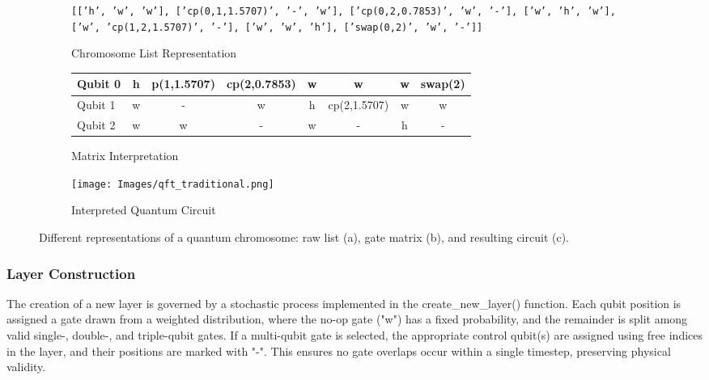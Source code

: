 \documentclass[11pt,a4paper]{article}
\begin{document}
\begin{figure}[H]
    \centering

    \begin{subfigure}[b]{0.9\textwidth}
        \centering
        \texttt{[['h', 'w', 'w'], ['cp(0,1,1.5707)', '-', 'w'], ['cp(0,2,0.7853)', 'w', '-'], ['w', 'h', 'w'], 
        ['w', 'cp(1,2,1.5707)', '-'], ['w', 'w', 'h'], ['swap(0,2)', 'w', '-']]}
        \caption{Chromosome List Representation}
        \label{fig:chromosome_list}
    \end{subfigure}

    \vspace{1em}

    \begin{subfigure}[b]{0.65\textwidth}
        \centering
        \small
        \begin{tabular}{l | c c c c c c c}
            \toprule
            Qubit 0 & h & p(1,1.5707) & cp(2,0.7853) & w & w & w & swap(2) \\
            \midrule
            Qubit 1 & w & - & w & h & cp(2,1.5707) & w & w \\
            \midrule
            Qubit 2 & w & w & - & w & - & h & - \\
            \bottomrule
        \end{tabular}
        \caption{Matrix Interpretation}
        \label{fig:chromosome_matrix}
    \end{subfigure}

    \vspace{1em}

    \begin{subfigure}[b]{0.6\textwidth}
        \centering
        \texttt{[image: Images/qft\_traditional.png]}
        \caption{Interpreted Quantum Circuit}
        \label{fig:chromosome_circuit}
    \end{subfigure}

    \caption{Different representations of a quantum chromosome: raw list (a), gate matrix (b), and resulting circuit (c).}
    \label{fig:chromosome_representations}
\end{figure}\newpage

\subsubsection*{Layer Construction}
The creation of a new layer is governed by a stochastic process implemented in the create\_new\_layer() function. Each qubit position is assigned a gate drawn from a weighted distribution, where the no-op gate ("w") has a fixed probability, and the remainder is split among valid single-, double-, and triple-qubit gates. If a multi-qubit gate is selected, the appropriate control qubit(s) are assigned using free indices in the layer, and their positions are marked with "-". This ensures no gate overlaps occur within a single timestep, preserving physical validity.
\end{document}
